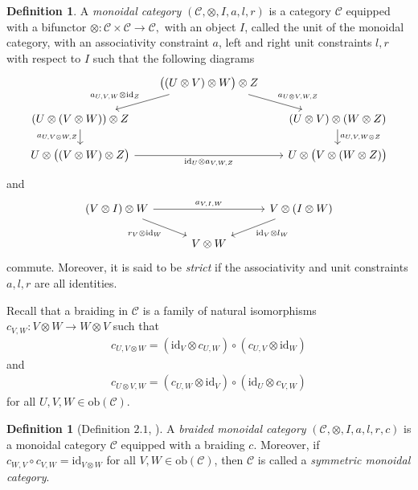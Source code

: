 \documentclass[11pt]{amsart}
\newcommand{\calC}{\mathcal{C}}
\newcommand{\ob}{\mathrm{ob}}
\newcommand{\id}{\mathrm{id}}
\theoremstyle{definition}
\newtheorem{defi}[theo]{Definition}
\numberwithin{equation}{section}
\begin{document}
\begin{defi}
A \emph{monoidal category} $(\calC, \otimes, I, a, l,r )$ is a category $\calC$ equipped with a bifunctor $\otimes: \calC \times \calC \rightarrow \calC,$ with an object $I$, called the unit of the monoidal category, with an associativity constraint $a$, left and right unit constraints $l,r$ with respect to $I$ such that the following diagrams 
\[
\begin{tikzcd}[column sep=1.8em, row sep=3.2ex]
				& \bigl((U\otimes V)\otimes W\bigr)\otimes Z
				\ar[dl, "a_{U,V,W}\otimes\mathrm{id}_Z"']
				\ar[dr, "a_{U\otimes V,W,Z}"] \\
				(U\otimes(V\otimes W))\otimes Z
				\ar[d, "a_{U,V\otimes W,Z}"']
				&& (U\otimes V)\otimes(W\otimes Z)
				\ar[d, "a_{U,V,W\otimes Z}"] \\
				U\otimes\bigl((V\otimes W)\otimes Z\bigr)
				\ar[rr, "\mathrm{id}_U\otimes a_{V,W,Z}"']
		 	&& U\otimes\bigl(V\otimes(W\otimes Z)\bigr)
\end{tikzcd}
\]
and
\[
			\begin{tikzcd}[column sep=3em, row sep=3.5ex]
				(V\otimes I)\otimes W
				\ar[rr, "a_{V,I,W}"]
				\ar[dr, "r_V\otimes\mathrm{id}_W"']
				&& V\otimes(I\otimes W)
				\ar[dl, "\mathrm{id}_V\otimes l_W"] \\
				& V\otimes W
			\end{tikzcd}
\]
commute. Moreover, it is said to be \emph{strict} if the associativity and unit constraints $a,l,r$ are all identities. 
\end{defi}
		
Recall that a braiding in $\calC$ is a family of natural isomorphisms $c_{V,W}: V\otimes W \rightarrow W\otimes V$
such that 
\begin{align}\label{braid1}
	c_{U,V\otimes W}= (\id_V \otimes c_{U,W} ) \circ (c_{U,V}\otimes \id_W)
\end{align}
and
\begin{align}\label{braid2}
	c_{U\otimes V,W}=(c_{U,W}\otimes \id_V) \circ (\id_U \otimes c_{V,W})
\end{align}
for all $U,V,W \in \ob(\calC)$. 
\begin{defi}[Definition $2.1$, \cite{JS93}]
A \emph{braided monoidal category} $(\calC, \otimes, I,a,l,r,c )$ is a monoidal category $\calC$ equipped with a braiding $c$. Moreover, if $c_{W,V} \circ c_{V,W} = \id_{V\otimes W }$ for all $V,W\in \ob(\calC)$, then $\calC$ is called a \emph{symmetric monoidal category}. 
\end{defi}
		
\end{document}
